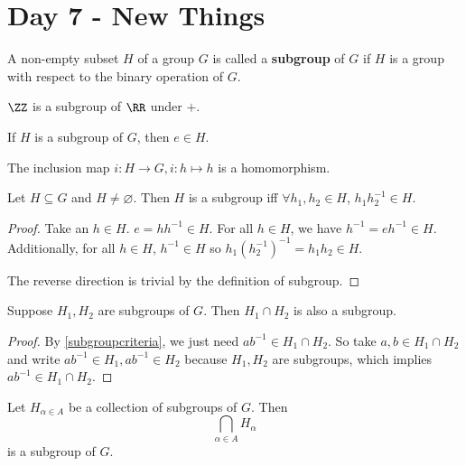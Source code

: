 \section{Day 7 - New Things}

\begin{df}
A non-empty subset $H$ of a group $G$ is called a \textbf{subgroup} of
$G$ if $H$ is a group with respect to the binary operation of $G$.
\end{df}

\begin{ex}
$\ZZ$ is a subgroup of $\RR$ under $+$.
\end{ex}

\begin{rem}
If $H$ is a subgroup of $G$, then $e \in H$.
\end{rem}

\begin{rem}
The inclusion map $i : H \to G, i : h \mapsto h$ is a homomorphism.
\end{rem}

\begin{prop}
\label{subgroupcriteria}
Let $H \subseteq G$ and $H \neq \varnothing$. Then $H$ is a subgroup iff
$\forall h_1, h_2 \in H$, $h_1 h_2^{-1} \in H$.
\end{prop}

\begin{proof}
Take an $h \in H$. $e = h h^{-1} \in H$. For all $h \in H$, we have
$h^{-1} = e h^{-1} \in H$. Additionally, for all $h \in H$, $h^{-1} \in
H$ so $h_1 (h_2^{-1})^{-1} = h_1 h_2 \in H$.

The reverse direction is trivial by the definition of subgroup.
\end{proof}

\begin{prop}
Suppose $H_1, H_2$ are subgroups of $G$. Then $H_1 \cap H_2$ is also a
subgroup.
\end{prop}

\begin{proof}
By \ref{subgroupcriteria}, we just need $ab^{-1} \in H_1 \cap H_2$. So
take $a, b \in H_1 \cap H_2$ and write $ab^{-1} \in H_1, ab^{-1} \in
H_2$ because $H_1, H_2$ are subgroups, which implies $ab^{-1} \in H_1
\cap H_2$.
\end{proof}

\begin{thm}
Let $H_{\alpha \in A}$ be a collection of subgroups of $G$. Then
\[ \bigcap_{\alpha \in A} H_\alpha \]
is a subgroup of $G$.
\end{thm}

